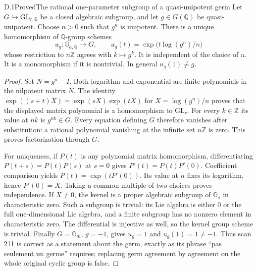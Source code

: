 \begin{statement}{D.1}{Proved}{The rational one-parameter subgroup of a quasi-unipotent germ}
Let $G\hookrightarrow\mathrm{GL}_{r,\mathbb Q}$ be a closed algebraic
subgroup, and let $g\in G(\mathbb Q)$ be quasi-unipotent.  Choose $n>0$
such that $g^n$ is unipotent.  There is a unique homomorphism of
$\mathbb Q$-group schemes
\[
 u_g:\mathbb G_{a,\mathbb Q}\longrightarrow G,
 \qquad u_g(t)=\exp\bigl(t\log(g^n)/n\bigr)
\]
whose restriction to $n\mathbb Z$ agrees with $k\mapsto g^k$.
It is independent of the choice of $n$.  It is a monomorphism if it is
nontrivial.  In general $u_g(1)\ne g$.
\end{statement}
\begin{proof}
Set $N=g^n-I$.  Both logarithm and exponential are finite polynomials
in the nilpotent matrix $N$.  The identity
$\exp((s+t)X)=\exp(sX)\exp(tX)$ for $X=\log(g^n)/n$ proves that
the displayed matrix polynomial is a homomorphism to $\mathrm{GL}_r$.
For every $k\in\mathbb Z$ its value at $nk$ is $g^{nk}\in G$.
Every equation defining $G$ therefore vanishes after substitution:
a rational polynomial vanishing at the infinite set $n\mathbb Z$
is zero.  This proves factorization through $G$.

For uniqueness, if $P(t)$ is any polynomial matrix homomorphism,
differentiating $P(t+s)=P(t)P(s)$ at $s=0$ gives
$P'(t)=P(t)P'(0)$.  Coefficient comparison yields
$P(t)=\exp(tP'(0))$.  Its value at $n$ fixes its logarithm, hence
$P'(0)=X$.  Taking a common multiple of two choices proves independence.
If $X\ne0$, the kernel is a proper algebraic subgroup of
$\mathbb G_a$ in characteristic zero.  Such a subgroup is trivial:
its Lie algebra is either $0$ or the full one-dimensional Lie algebra,
and a finite subgroup has no nonzero element in characteristic zero.
The differential is injective as well, so the kernel group scheme is
trivial.  Finally $G=\mathbb G_m$, $g=-1$, gives $u_g=1$ and
$u_g(1)=1\ne-1$.  Thus scan 211 is correct as a statement about
the germ, exactly as its phrase ``pas seulement un germe'' requires;
replacing germ agreement by agreement on the whole original cyclic
group is false.
\end{proof}

